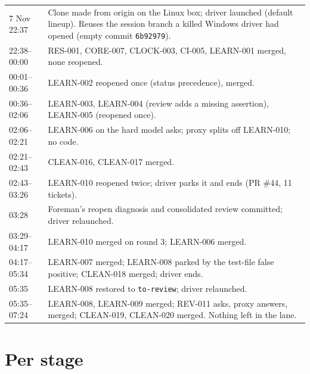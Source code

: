 \documentclass[11pt,a4paper]{article}
\begin{document}
{\small
\begin{tabularx}{\linewidth}{@{}lX@{}}
\toprule
7 Nov 22:37 & Clone made from origin on the Linux box; driver launched (default lineup). Reuses the
        session branch a killed Windows driver had opened (empty commit \texttt{6b92979}). \\
22:38--00:00 & RES-001, CORE-007, CLOCK-003, CI-005, LEARN-001 merged, none reopened. \\
00:01--00:36 & LEARN-002 reopened once (status precedence), merged. \\
00:36--02:06 & LEARN-003, LEARN-004 (review adds a missing assertion), LEARN-005 (reopened once). \\
02:06--02:21 & LEARN-006 on the hard model asks; proxy splits off LEARN-010; no code. \\
02:21--02:43 & CLEAN-016, CLEAN-017 merged. \\
02:43--03:26 & LEARN-010 reopened twice; driver parks it and ends (PR \#44, 11 tickets). \\
03:28 & Foreman's reopen diagnosis and consolidated review committed; driver relaunched. \\
03:29--04:17 & LEARN-010 merged on round 3; LEARN-006 merged. \\
04:17--05:34 & LEARN-007 merged; LEARN-008 parked by the test-file false positive; CLEAN-018 merged;
        driver ends. \\
05:35 & LEARN-008 restored to \texttt{to-review}; driver relaunched. \\
05:35--07:24 & LEARN-008, LEARN-009 merged; REV-011 asks, proxy answers, merged; CLEAN-019,
        CLEAN-020 merged. Nothing left in the lane. \\
\bottomrule
\end{tabularx}
}

\section*{Per stage}
\end{document}
